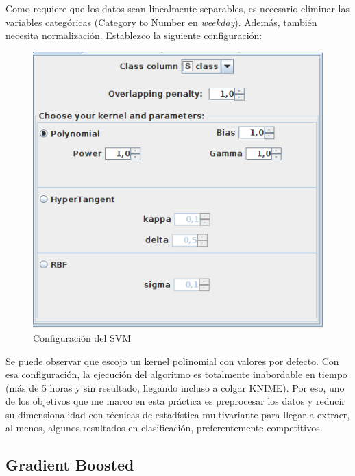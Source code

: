 Como requiere que los datos sean linealmente separables, es necesario eliminar las variables categóricas (Category to Number en \textit{weekday}). Además, también necesita normalización. Establezco la siguiente configuración:

\begin{figure}[H] %
	\centering
	\includegraphics[scale=0.4]{conf-svm-p.png}  %
	\caption{Configuración del SVM} 
	\label{fig:conf-svm}
\end{figure}

Se puede observar que escojo un kernel polinomial con valores por defecto. Con esa configuración, la ejecución del algoritmo es totalmente inabordable en tiempo (más de 5 horas y sin resultado, llegando incluso a colgar KNIME). Por eso, uno de los objetivos que me marco en esta práctica es preprocesar los datos y reducir su dimensionalidad con técnicas de estadística multivariante para llegar a extraer, al menos, algunos resultados en clasificación, preferentemente competitivos.

\subsection{Gradient Boosted}

